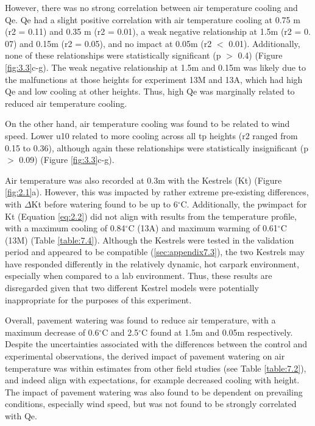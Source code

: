 \documentclass[final,3p,times,authoryear]{elsarticle}
\begin{document}
However, there was no strong correlation between air temperature cooling and \gls{Qe}. \gls{Qe} had a slight positive correlation with air temperature cooling at 0.75 m (\gls{r2} = 0.11) and 0.35 m (\gls{r2} = 0.01), a weak negative relationship at 1.5m (\gls{r2} = 0. 07) and 0.15m (\gls{r2} = 0.05), and no impact at 0.05m (\gls{r2} $<$ 0.01). Additionally, none of these relationships were statistically significant (\gls{p} $>$ 0.4) (Figure \ref{fig:3.3}c-g). The weak negative relationship at 1.5m and 0.15m was likely due to the malfunctions at those heights for experiment 13M and 13A, which had high \gls{Qe} and low cooling at other heights. Thus, high \gls{Qe} was marginally related to reduced air temperature cooling.

On the other hand, air temperature cooling was found to be related to wind speed. Lower \gls{u10} related to more cooling across all \gls{tp} heights (\gls{r2} ranged from 0.15 to 0.36), although again these relationships were statistically insignificant (\gls{p} $>$ 0.09) (Figure \ref{fig:3.3}c-g).

Air temperature was also recorded at 0.3m with the Kestrels (\gls{Kt}) (Figure \ref{fig:2.1}a). However, this was impacted by rather extreme pre-existing differences, with $\Delta$\gls{Kt} before watering found to be up to 6$^{\circ}$C. Additionally, the \gls{pwimpact} for \gls{Kt} (Equation \ref{eq:2.2}) did not align with results from the temperature profile, with a maximum cooling of 0.84$^{\circ}$C (13A) and maximum warming of 0.61$^{\circ}$C (13M) (Table \ref{table:7.4}). Although the Kestrels were tested in the validation period and appeared to be compatible (\ref{sec:appendix7.3}), the two Kestrels may have responded differently in the relatively dynamic, hot carpark environment, especially when compared to a lab environment. Thus, these results are disregarded given that two different Kestrel models were potentially inappropriate for the purposes of this experiment.

Overall, pavement watering was found to reduce air temperature, with a maximum decrease of 0.6$^{\circ}$C and 2.5$^{\circ}$C found at 1.5m and 0.05m respectively. Despite the uncertainties associated with the differences between the control and experimental observations, the derived impact of pavement watering on air temperature was within estimates from other field studies (see Table \ref{table:7.2}), and indeed align with expectations, for example decreased cooling with height. The impact of pavement watering was also found to be dependent on prevailing conditions, especially wind speed, but was not found to be strongly correlated with \gls{Qe}.
\end{document}
